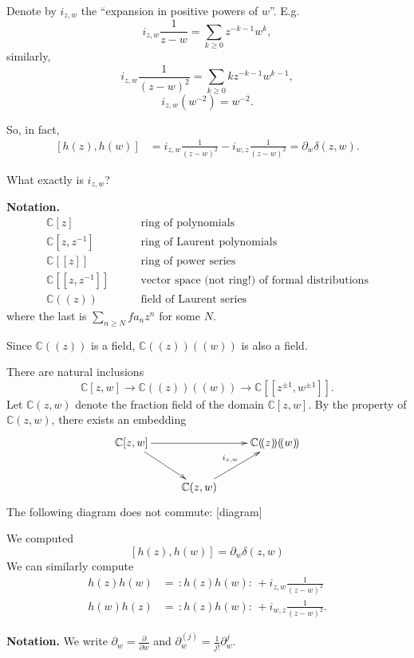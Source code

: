 Denote by $i_{z,w}$ the ``expansion in
positive powers of $w$''.
E.g.
$$
i_{z,w}\frac{1}{z-w}=\sum_{k\geq
0}z^{-k-1}w^k,
$$
similarly,
$$
i_{z,w}\frac{1}{(z-w)^2}=\sum_{k \geq
0}kz^{-k-1}w^{k-1},
$$
$$
i_{z,w}(w^{-2})=w^{-2}.
$$
\begin{exercise}
\label{exercise-derivative-wrt-w}
So, in fact,
$$
\begin{aligned}
[h(z),h(w)]&=i_{z,w}\frac{1}{(z-w)^2}-i_{w,z}
\frac{1}{(z-w)^2}
=\partial_w \delta(z,w).
\end{aligned}
$$
\end{exercise}

What exactly is $i_{z,w}$?

\medskip\noindent
{\bf Notation.}
$$
\begin{aligned}
\mathbb{C}[z]&\qquad \text{ring of
polynomials}\\
\mathbb{C}[z,z^{-1}]&\qquad \text{ring of
Laurent polynomials}\\
\mathbb{C}[\![z ]\!]&\qquad \text{ring of
power series}\\
\mathbb{C}[\![z,z^{-1}]\!]&  \qquad
\text{vector space (not ring!) of formal
distributions}\\
\mathbb{C}(\!(z)\!)&\qquad \text{field of
Laurent series}
\end{aligned}
$$
where the last is $\sum_{n \geq N}fa_n z^n$
for some $N$.

Since $\mathbb{C}(\!(z)\!)$ is a field,
$\mathbb{C}(\!(z)\!)(\!(w)\!)$ is
also a field.

There are natural inclusions
$$
\mathbb{C}[z,w] \to
\mathbb{C}(\!(z)\!)(\!(w)\!) \to
\mathbb{C}[\![z^{\pm1},w^{\pm 1}]\!].
$$
Let $\mathbb{C}(z,w)$ denote the fraction
field
of the domain $\mathbb{C}[z,w]$.
By the property of $\mathbb{C}(z,w)$, there
exists an embedding
$$
\xymatrix{
\mathbb{C}[z,w]\ar[rr]\ar[dr]&  &
\mathbb{C}(\!(z)\!)(\!(w)\!)\\
&\mathbb{C}(z,w)\ar[ur]^{i_{z,w}}
}
$$
The following diagram does not commute:
[diagram]

We computed
$$
[h(z),h(w)]=\partial_w \delta(z,w)
$$
We can similarly compute
$$
\begin{aligned}
h(z)h(w)&=\,:\!h(z)h(w)\!:\,+i_{z,w}\frac{1}
{(z-w)^2}\\
h(w)h(z)&=\,:\!h(z)h(w)\!:\,+i_{w,z}\frac{1}
{(z-w)^2}.
\end{aligned}
$$

\medskip\noindent
{\bf Notation.} We write
$\partial_w=\frac{\partial }{\partial w}$ and
$\partial^{(j)}_w=\frac{1}{j!}\partial^j_w$.

